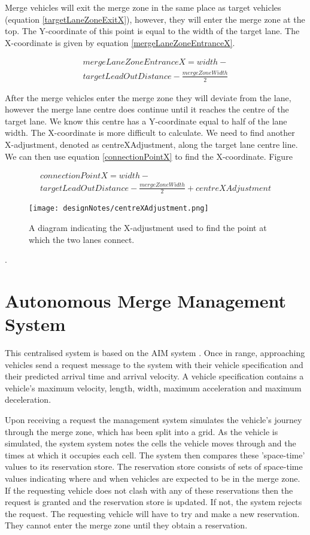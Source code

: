 Merge vehicles will exit the merge zone in the same place as target vehicles (equation \ref{targetLaneZoneExitX}), however, they will enter the merge zone at the top. The Y-coordinate of this point is equal to the width of the target lane. The X-coordinate is given by equation \ref{mergeLaneZoneEntranceX}.

\begin{multline}\label{mergeLaneZoneEntranceX}
mergeLaneZoneEntranceX = width - \\
targetLeadOutDistance - \frac{mergeZoneWidth}{2}
\end{multline}

After the merge vehicles enter the merge zone they will deviate from the lane, however the merge lane centre does continue until it reaches the centre of the target lane. We know this centre has a Y-coordinate equal to half of the lane width. The X-coordinate is more difficult to calculate. We need to find another X-adjustment, denoted as centreXAdjustment, along the target lane centre line. We can then use equation \ref{connectionPointX} to find the X-coordinate. Figure 

\begin{multline}\label{connectionPointX}
connectionPointX = width - \\
targetLeadOutDistance - \frac{mergeZoneWidth}{2} + centreXAdjustment
\end{multline}

\begin{figure}[htb]
\texttt{[image: designNotes/centreXAdjustment.png]}
\caption{A diagram indicating the X-adjustment used to find the point at which the two lanes connect.}
\label{fig:centreXAdjustment}
\end{figure}.

\section{Autonomous Merge Management System}
\label{sec:Autonomous Merge Management System}
This centralised system is based on the AIM system \citep{Dresner2004}. Once in range, approaching vehicles send a request message to the system with their vehicle specification and their predicted arrival time and arrival velocity. A vehicle specification contains a vehicle's maximum velocity, length, width, maximum acceleration and maximum deceleration.

Upon receiving a request the management system simulates the vehicle's journey through the merge zone, which has been split into a grid. As the vehicle is simulated, the system system notes the cells the vehicle moves through and the times at which it occupies each cell. The system then compares these 'space-time' values to its reservation store. The reservation store consists of sets of space-time values indicating where and when vehicles are expected to be in the merge zone. If the requesting vehicle does not clash with any of these reservations then the request is granted and the reservation store is updated. If not, the system rejects the request. The requesting vehicle will have to try and make a new reservation. They cannot enter the merge zone until they obtain a reservation.

